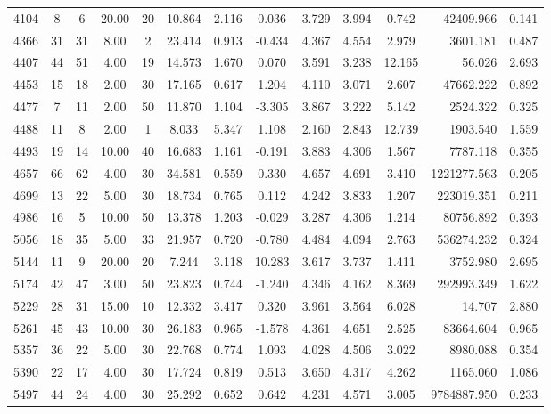 \documentclass[mnsc]{informs3}
\begin{document}
\begin{APPENDICES}
\begin{longtable}{cccccccccccrc}
4104 & 8 & 6 & 20.00 & 20 & 10.864 & 2.116 & 0.036 & 3.729 & 3.994 & 0.742 & 42409.966 & 0.141 \\
4366 & 31 & 31 & 8.00 & 2 & 23.414 & 0.913 & -0.434 & 4.367 & 4.554 & 2.979 & 3601.181 & 0.487 \\
4407 & 44 & 51 & 4.00 & 19 & 14.573 & 1.670 & 0.070 & 3.591 & 3.238 & 12.165 & 56.026 & 2.693 \\
4453 & 15 & 18 & 2.00 & 30 & 17.165 & 0.617 & 1.204 & 4.110 & 3.071 & 2.607 & 47662.222 & 0.892 \\
4477 & 7 & 11 & 2.00 & 50 & 11.870 & 1.104 & -3.305 & 3.867 & 3.222 & 5.142 & 2524.322 & 0.325 \\
4488 & 11 & 8 & 2.00 & 1 & 8.033 & 5.347 & 1.108 & 2.160 & 2.843 & 12.739 & 1903.540 & 1.559 \\
4493 & 19 & 14 & 10.00 & 40 & 16.683 & 1.161 & -0.191 & 3.883 & 4.306 & 1.567 & 7787.118 & 0.355 \\
4657 & 66 & 62 & 4.00 & 30 & 34.581 & 0.559 & 0.330 & 4.657 & 4.691 & 3.410 & 1221277.563 & 0.205 \\
4699 & 13 & 22 & 5.00 & 30 & 18.734 & 0.765 & 0.112 & 4.242 & 3.833 & 1.207 & 223019.351 & 0.211 \\
4986 & 16 & 5 & 10.00 & 50 & 13.378 & 1.203 & -0.029 & 3.287 & 4.306 & 1.214 & 80756.892 & 0.393 \\
5056 & 18 & 35 & 5.00 & 33 & 21.957 & 0.720 & -0.780 & 4.484 & 4.094 & 2.763 & 536274.232 & 0.324 \\
5144 & 11 & 9 & 20.00 & 20 & 7.244 & 3.118 & 10.283 & 3.617 & 3.737 & 1.411 & 3752.980 & 2.695 \\
5174 & 42 & 47 & 3.00 & 50 & 23.823 & 0.744 & -1.240 & 4.346 & 4.162 & 8.369 & 292993.349 & 1.622 \\
5229 & 28 & 31 & 15.00 & 10 & 12.332 & 3.417 & 0.320 & 3.961 & 3.564 & 6.028 & 14.707 & 2.880 \\
5261 & 45 & 43 & 10.00 & 30 & 26.183 & 0.965 & -1.578 & 4.361 & 4.651 & 2.525 & 83664.604 & 0.965 \\
5357 & 36 & 22 & 5.00 & 30 & 22.768 & 0.774 & 1.093 & 4.028 & 4.506 & 3.022 & 8980.088 & 0.354 \\
5390 & 22 & 17 & 4.00 & 30 & 17.724 & 0.819 & 0.513 & 3.650 & 4.317 & 4.262 & 1165.060 & 1.086 \\
5497 & 44 & 24 & 4.00 & 30 & 25.292 & 0.652 & 0.642 & 4.231 & 4.571 & 3.005 & 9784887.950 & 0.233 \\

\end{longtable}
\end{APPENDICES}
\end{document}

